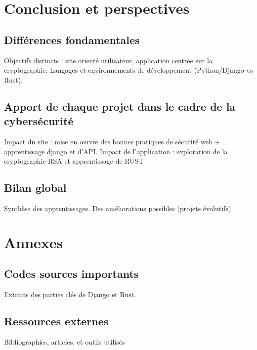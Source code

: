 \documentclass[12pt]{article} %
\begin{document}
\section{Conclusion et perspectives}
	\subsection{Différences fondamentales}
		Objectifs distincts : site orienté utilisateur, application centrée sur la cryptographie.
Langages et environnements de développement (Python/Django vs Rust).


	\subsection{Apport de chaque projet dans le cadre de la cybersécurité}
		Impact du site : mise en œuvre des bonnes pratiques de sécurité web + apprentissage django et d’API.
Impact de l’application : exploration de la cryptographie RSA et apprentissage de RUST
	
	
	
	\subsection{Bilan global}
		Synthèse des apprentissages.
Des améliorations possibles (projets évolutifs)



\section*{Annexes}
	\subsection{Codes sources importants}
		Extraits des parties clés de Django et Rust.
	\subsection{Ressources externes}
		Bibliographies, articles, et outils utilisés
\end{document}
